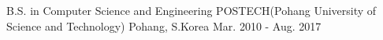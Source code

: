

\begin{cventries}

  \cventry
    {B.S. in Computer Science and Engineering} %
    {POSTECH(Pohang University of Science and Technology)} %
    {Pohang, S.Korea} %
    {Mar. 2010 - Aug. 2017} %

\end{cventries}
